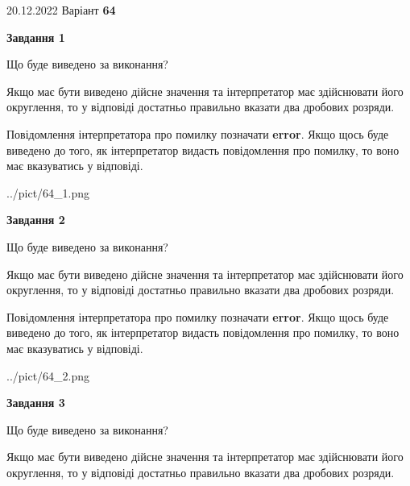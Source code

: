 \documentclass[12pt, ukrainian]{article}
\begin{document}
{20.12.2022 Варіант \No \textbf { 64 }\par}
{
\begin {Large}

{\begin {center}\textbf{Завдання 1}\end {center}}\par
Що буде виведено за виконання? \par

Якщо має бути виведено дійсне значення та інтерпретатор має здійснювати його округлення, 
то у відповіді достатньо правильно вказати два дробових розряди.

Повідомлення інтерпретатора про помилку позначати \textbf{error}.
Якщо щось буде виведено до того, як інтерпретатор видасть повідомлення про помилку, 
то воно має вказуватись у відповіді. \par

\begin{center}
	{../pict/64_1.png}
\end{center}
\newpage

{\begin {center}\textbf{Завдання 2}\end {center}}\par
Що буде виведено за виконання? \par

Якщо має бути виведено дійсне значення та інтерпретатор має здійснювати його округлення, 
то у відповіді достатньо правильно вказати два дробових розряди.

Повідомлення інтерпретатора про помилку позначати \textbf{error}.
Якщо щось буде виведено до того, як інтерпретатор видасть повідомлення про помилку, 
то воно має вказуватись у відповіді. \par

\begin{center}
	{../pict/64_2.png}
\end{center}
\newpage

{\begin {center}\textbf{Завдання 3}\end {center}}\par
Що буде виведено за виконання? \par

Якщо має бути виведено дійсне значення та інтерпретатор має здійснювати його округлення, 
то у відповіді достатньо правильно вказати два дробових розряди.


\end{Large}}
\end{document}
